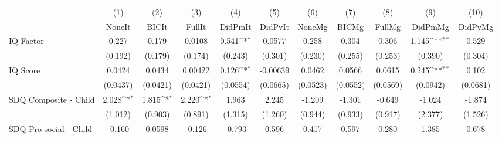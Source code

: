 {
\def\sym#1{\ifmmode^{#1}\else\(^{#1}\)\fi}
\begin{tabular}{l*{10}{c}}
\toprule
            &\multicolumn{1}{c}{(1)}&\multicolumn{1}{c}{(2)}&\multicolumn{1}{c}{(3)}&\multicolumn{1}{c}{(4)}&\multicolumn{1}{c}{(5)}&\multicolumn{1}{c}{(6)}&\multicolumn{1}{c}{(7)}&\multicolumn{1}{c}{(8)}&\multicolumn{1}{c}{(9)}&\multicolumn{1}{c}{(10)}\\
            &\multicolumn{1}{c}{NoneIt}&\multicolumn{1}{c}{BICIt}&\multicolumn{1}{c}{FullIt}&\multicolumn{1}{c}{DidPmIt}&\multicolumn{1}{c}{DidPvIt}&\multicolumn{1}{c}{NoneMg}&\multicolumn{1}{c}{BICMg}&\multicolumn{1}{c}{FullMg}&\multicolumn{1}{c}{DidPmMg}&\multicolumn{1}{c}{DidPvMg}\\
\midrule
IQ Factor   &       0.227         &       0.179         &      0.0108         &       0.541\sym{*}  &      0.0577         &       0.258         &       0.304         &       0.306         &       1.145\sym{**} &       0.529         \\
            &     (0.192)         &     (0.179)         &     (0.174)         &     (0.243)         &     (0.301)         &     (0.230)         &     (0.255)         &     (0.253)         &     (0.390)         &     (0.304)         \\
\addlinespace
IQ Score    &      0.0424         &      0.0434         &     0.00422         &       0.126\sym{*}  &    -0.00639         &      0.0462         &      0.0566         &      0.0615         &       0.245\sym{**} &       0.102         \\
            &    (0.0437)         &    (0.0421)         &    (0.0421)         &    (0.0554)         &    (0.0665)         &    (0.0523)         &    (0.0552)         &    (0.0569)         &    (0.0942)         &    (0.0681)         \\
\addlinespace
SDQ Composite - Child&       2.028\sym{*}  &       1.815\sym{*}  &       2.220\sym{*}  &       1.963         &       2.245         &      -1.209         &      -1.301         &      -0.649         &      -1.024         &      -1.874         \\
            &     (1.012)         &     (0.903)         &     (0.891)         &     (1.315)         &     (1.260)         &     (0.944)         &     (0.933)         &     (0.917)         &     (2.377)         &     (1.526)         \\
\addlinespace
SDQ Pro-social - Child&      -0.160         &      0.0598         &      -0.126         &      -0.793         &       0.596         &       0.417         &       0.597         &       0.280         &       1.385         &       0.678         \\

\end{tabular}}
